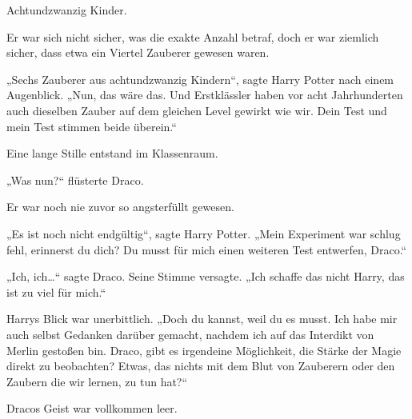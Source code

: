 Achtundzwanzig Kinder.

Er war sich nicht sicher, was die exakte Anzahl betraf, doch er war ziemlich sicher, dass etwa ein Viertel Zauberer gewesen waren.

„Sechs Zauberer aus achtundzwanzig Kindern“, sagte Harry Potter nach einem Augenblick. „Nun, das wäre das. Und Erstklässler haben vor acht Jahrhunderten auch dieselben Zauber auf dem gleichen Level gewirkt wie wir. Dein Test und mein Test stimmen beide überein.“

Eine lange Stille entstand im Klassenraum.

„Was nun?“ flüsterte Draco.

Er war noch nie zuvor so angsterfüllt gewesen.

„Es ist noch nicht endgültig“, sagte Harry Potter. „Mein Experiment war schlug fehl, erinnerst du dich? Du musst für mich einen weiteren Test entwerfen, Draco.“

„Ich, ich…“ sagte Draco. Seine Stimme versagte. „Ich schaffe das nicht Harry, das ist zu viel für mich.“

Harrys Blick war unerbittlich. „Doch du kannst, weil du es musst. Ich habe mir auch selbst Gedanken darüber gemacht, nachdem ich auf das Interdikt von Merlin gestoßen bin. Draco, gibt es irgendeine Möglichkeit, die Stärke der Magie direkt zu beobachten? Etwas, das nichts mit dem Blut von Zauberern oder den Zaubern die wir lernen, zu tun hat?“

Dracos Geist war vollkommen leer.

